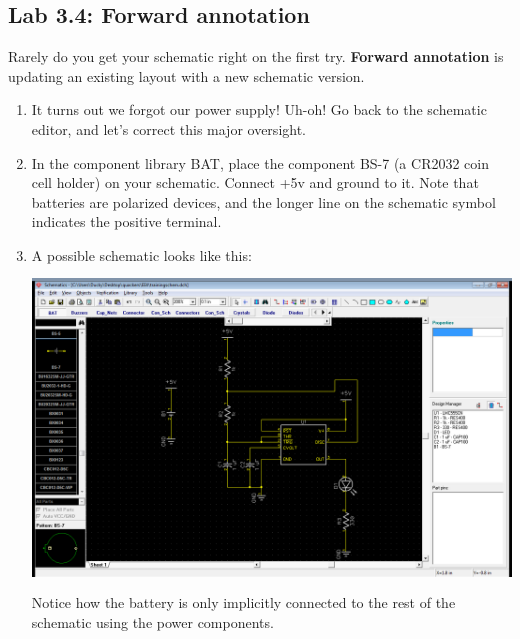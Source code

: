 \documentclass[letterpaper]{article}
\newcounter{saveenum}
\newcommand\liststyleRTFNumvi{%
\renewcommand\theenumi{\arabic{enumi}}
\renewcommand\theenumii{\alph{enumii}}
\renewcommand\theenumiii{\roman{enumiii}}
\renewcommand\theenumiv{\arabic{enumiv}}
\renewcommand\labelenumi{\theenumi.}
\renewcommand\labelenumii{\theenumii.}
\renewcommand\labelenumiii{\theenumiii.}
\renewcommand\labelenumiv{\theenumiv.}
}
\begin{document}
\bigskip

\subsection{Lab 3.4: Forward annotation}
\hypertarget{Toc337742699}{}{\sffamily\color[rgb]{0.30980393,0.5058824,0.7411765}
Rarely do you get your schematic right on the first try. \textbf{Forward annotation} is updating an existing layout with
a new schematic version.}


\bigskip

\liststyleRTFNumvi
\setcounter{saveenum}{\value{enumi}}
\begin{enumerate}
\setcounter{enumi}{\value{saveenum}}
\item {\sffamily\color[rgb]{0.30980393,0.5058824,0.7411765}
It turns out we forgot our power supply! Uh-oh! Go back to the schematic editor, and let's correct this major
oversight.}
\item {\sffamily\color[rgb]{0.30980393,0.5058824,0.7411765}
In the component library {\textquotedbl}BAT,{\textquotedbl} place the component {\textquotedbl}BS-7{\textquotedbl} (a
CR2032 coin cell holder) on your schematic. Connect +5v and ground to it. Note that batteries are polarized devices,
and the longer line on the schematic symbol indicates the positive terminal.}
\item {\sffamily\color[rgb]{0.30980393,0.5058824,0.7411765}
A possible schematic looks like this:\newline
 \includegraphics[width=5.4in,height=3.3665in]{figures/ee4document-img027.png} \newline
Notice how the battery is only implicitly connected to the rest of the schematic using the power components.\newline
}
\end{enumerate}
\end{document}
